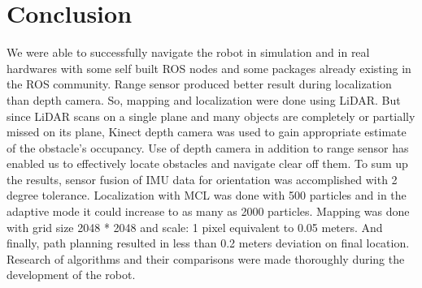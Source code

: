 \documentclass[journal,twoside]{IEEEtran}
\begin{document}
\section{Conclusion}
\noindent We were able to successfully navigate the robot in simulation and in real hardwares with some self built ROS nodes and some packages already existing in the ROS community. Range sensor produced better result during localization than depth camera. So, mapping and localization were done using LiDAR. But since LiDAR scans on a single plane and many objects are completely or partially missed on its plane, Kinect depth camera was used to gain appropriate estimate of the obstacle’s occupancy. Use of depth camera in addition to range sensor has enabled us to effectively locate obstacles
and navigate clear off them. To sum up the results, sensor fusion of IMU data for orientation was accomplished with 2 degree tolerance. Localization with MCL was done with 500 particles and in the adaptive mode it could increase to as many as 2000 particles. Mapping was done with grid size 2048 * 2048 and scale: 1 pixel equivalent to 0.05 meters. And finally, path planning resulted in less than 0.2 meters deviation on final location. Research of algorithms and their comparisons were made thoroughly during the development of the robot.



%
%

\end{document}
